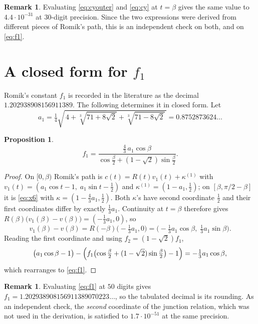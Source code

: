 \documentclass[11pt]{article}
\newtheorem{proposition}[theorem]{Proposition}
\theoremstyle{definition}
\newtheorem{remark}[theorem]{Remark}
\begin{document}
\begin{remark}
Evaluating \eqref{eq:cyouter} and \eqref{eq:cy} at $t=\beta$ gives the same value
to $4.4\cdot 10^{-31}$ at $30$-digit precision. Since the two expressions were
derived from different pieces of Romik's path, this is an independent check on
both, and on \eqref{eq:f1}.
\end{remark}

\section{A closed form for $f_1$}

Romik's constant $f_1$ is recorded in the literature as the decimal
$1.202938908156911389$. The following determines it in closed form. Let
\begin{equation}\label{eq:a1}
  a_1=\tfrac14\sqrt{\,4+\sqrt[3]{71+8\sqrt2}+\sqrt[3]{71-8\sqrt2}\,}
     =0.8752873624\ldots
\end{equation}

\begin{proposition}\label{prop:f1}
\begin{equation}\label{eq:f1}
  f_1=\frac{\tfrac43\,a_1\cos\beta}{\cos\frac\beta2+(1-\sqrt2)\sin\frac\beta2}.
\end{equation}
\end{proposition}

\begin{proof}
On $[0,\beta)$ Romik's path is $c(t)=R(t)v_1(t)+\kappa^{(1)}$ with
$v_1(t)=(a_1\cos t-1,\;a_1\sin t-\tfrac12)$ and
$\kappa^{(1)}=(1-a_1,\tfrac12)$; on $[\beta,\pi/2-\beta]$ it is \eqref{eq:x6}
with $\kappa=(1-\tfrac43 a_1,\tfrac12)$. Both $\kappa$'s have second coordinate
$\tfrac12$ and their first coordinates differ by exactly $\tfrac13 a_1$.
Continuity at $t=\beta$ therefore gives
$R(\beta)\bigl(v_1(\beta)-v(\beta)\bigr)=(-\tfrac13a_1,0)$, so
\[
  v_1(\beta)-v(\beta)=R(-\beta)\bigl(-\tfrac13a_1,0\bigr)
     =\bigl(-\tfrac13a_1\cos\beta,\;\tfrac13a_1\sin\beta\bigr).
\]
Reading the first coordinate and using $f_2=(1-\sqrt2)f_1$,
\[
  \bigl(a_1\cos\beta-1\bigr)-\Bigl(f_1\bigl(\cos\tfrac\beta2+(1-\sqrt2)\sin\tfrac\beta2\bigr)-1\Bigr)
   =-\tfrac13a_1\cos\beta,
\]
which rearranges to \eqref{eq:f1}.
\end{proof}

\begin{remark}
Evaluating \eqref{eq:f1} at $50$ digits gives
$f_1=1.202938908156911389070223\ldots$, so the tabulated decimal is its rounding.
As an independent check, the \emph{second} coordinate of the junction relation,
which was not used in the derivation, is satisfied to $1.7\cdot10^{-51}$ at the
same precision.
\end{remark}
\end{document}
